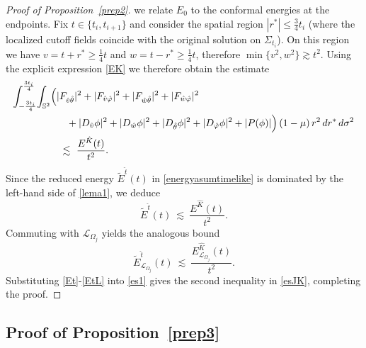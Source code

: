 \documentclass[11pt]{article}
\numberwithin{equation}{section}
\theoremstyle{plain}
\theoremstyle{definition}
\theoremstyle{remark}
\begin{document}
\begin{proof}[Proof of Proposition~\ref{prep2}]
\medskip
we relate $E_{0}$ to the conformal energies at the endpoints.
Fix $t\in\{t_i,t_{i+1}\}$ and consider the spatial region
\(
|r^{\ast}|\le \tfrac34 t_{i}
\)
(where the localized cutoff fields coincide with the original solution on $\Sigma_{t_i}$).
On this region we have $v=t+r^{\ast}\ge \tfrac14 t$ and $w=t-r^{\ast}\ge \tfrac14 t$, therefore
\(
\min\{v^{2},w^{2}\}\gtrsim t^{2}.
\)
Using the explicit expression \eqref{EK} we therefore obtain the estimate
\begin{eqnarray}\label{lema1}
\int_{-\frac{3t_{i}}{4}}^{\frac{3t_{i}}{4}}\!\int_{\mathbb S^{2}}
\Bigl(
&|F_{\hat v\hat\theta}|^{2}+|F_{\hat v\hat\varphi}|^{2}
+|F_{\hat w\hat\theta}|^{2}+|F_{\hat w\hat\varphi}|^{2}
\nonumber\\
&\quad
+|D_{\hat v}\phi|^{2}+|D_{\hat w}\phi|^{2}
+|D_{\hat\theta}\phi|^{2}+|D_{\hat\varphi}\phi|^{2}+|P(\phi)|
\Bigr)\,(1-\mu)\,r^{2}\,dr^{\ast}\,d\sigma^{2}
\nonumber\\
&\ \lesssim\ \frac{E^{\hat K}(t)}{t^{2}}.
\end{eqnarray}
Since the reduced energy $\tilde E^{\hat t}(t)$ in \eqref{energyasumtimelike} is dominated by the left-hand side of \eqref{lema1}, we deduce
\begin{equation}\label{Et}
\tilde E^{\hat t}(t)\ \lesssim\ \frac{E^{\hat K}(t)}{t^{2}}.
\end{equation}
Commuting with $\mathcal L_{\Omega_j}$ yields the analogous bound
\begin{equation}\label{EtL}
\tilde E^{\hat t}_{\mathcal L_{\Omega_j}}(t)\ \lesssim\ \frac{E^{\hat K}_{\mathcal L_{\Omega_j}}(t)}{t^{2}}.
\end{equation}
Substituting \eqref{Et}-\eqref{EtL} into \eqref{es1} gives the second inequality in \eqref{esJK}, completing the proof.
\end{proof}


\subsection{Proof of Proposition~\ref{prep3}}
\label{app:proof-prep3}
\end{document}
